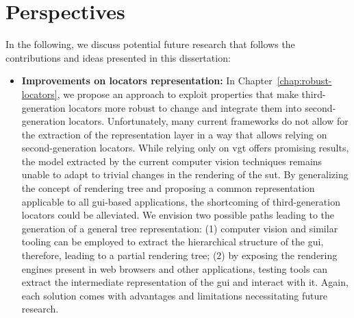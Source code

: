 \section{Perspectives}

In the following, we discuss potential future research that follows the contributions and ideas presented in this dissertation:

\begin{itemize}
    \item \textbf{Improvements on locators representation:} In Chapter~\ref{chap:robust-locators}, we propose an approach to exploit properties that make third-generation locators more robust to change and integrate them into second-generation locators. Unfortunately, many current frameworks do not allow for the extraction of the representation layer in a way that allows relying on second-generation locators. While relying only on \gls{vgt} offers promising results, the model extracted by the current computer vision techniques remains unable to adapt to trivial changes in the rendering of the \gls{sut}. By generalizing the concept of rendering tree and proposing a common representation applicable to all \gls{gui}-based applications, the shortcoming of third-generation locators could be alleviated. We envision two possible paths leading to the generation of a general tree representation: (1) computer vision and similar tooling can be employed to extract the hierarchical structure of the \gls{gui}, therefore, leading to a partial rendering tree; (2) by exposing the rendering engines present in web browsers and other applications, testing tools can extract the intermediate representation of the \gls{gui} and interact with it. Again, each solution comes with advantages and limitations necessitating future research.
    

\end{itemize}
